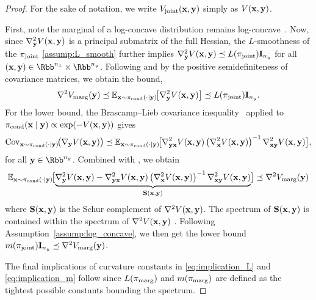 \documentclass[onefignum,onetabnum]{siamonline250211}
\newcommand{\bfI}{{\bf I}}
\newcommand{\bfS}{{\bf S}}
\newcommand{\bfx}{{\bf x}}
\newcommand{\bfy}{{\bf y}}
\newcommand{\nx}{{n_{x}}}
\newcommand{\ny}{{n_{y}}}
\newcommand{\pjoint}{\pi_{\rm joint}}
\newcommand{\pcond}{\pi_{\rm cond}}
\newcommand{\pmarg}{\pi_{\rm marg}}
\begin{document}
\begin{proof}
For the sake of notation, we write $V_{\rm joint}(\bfx,\bfy)$ simply as $V(\bfx, \bfy)$.

First, note the marginal of a log-concave distribution remains log-concave~\cite{prekopa_logarithmic_1973}.
    Now, since $\nabla_{\bfy}^2 V(\bfx, \bfy)$ is a principal submatrix of the full Hessian, the $L$-smoothness of the $\pjoint$ \ref{assump:L_smooth} further implies $\nabla_{\bfy}^2 V(\bfx, \bfy) \preceq L(\pjoint) \bfI_{\ny}$ for all  $(\bfx, \bfy)\in \Rbb^{\nx} \times \Rbb^\ny$.
    Following  and by the positive semidefiniteness of covariance matrices, we obtain the bound,
    \[
        \nabla^2 V_{\rm marg}(\bfy)
        \preceq
        \mathbb{E}_{\bfx\sim \pcond(\cdot \mid\bfy)}\!\bigl[\nabla_{\bfy}^2 V(\bfx,\bfy)\bigr]
        \preceq
        L(\pjoint) \bfI_{\ny}.
    \]
    For the lower bound, the Brascamp--Lieb covariance inequality~\cite[Theorem 4.2]{brascamp_extensions_1976} applied to $\pcond(\bfx\mid\bfy)\propto \exp(-V(\bfx,\bfy))$ gives
    \[
        \operatorname{Cov}_{\bfx \sim \pcond(\cdot\mid\bfy)}\!\bigl(\nabla_\bfy V(\bfx, \bfy)\bigr)
        \preceq
        \mathbb{E}_{\bfx\sim \pcond(\cdot \mid\bfy)}\!\bigl[\nabla_{\bfy\bfx}^2 V(\bfx, \bfy) \left(\nabla_{\bfx}^2 V(\bfx, \bfy)\right)^{-1}\nabla_{\bfx\bfy}^2V(\bfx, \bfy)\bigr],
    \]
    for all $\bfy\in \Rbb^{\ny}$.
    Combined with  , we obtain
    \begin{equation*}
        \label{eq:marginal-hessian-lower}
        \mathbb{E}_{\bfx\sim \pcond(\cdot \mid\bfy)}\!\bigl[ \underbrace{\nabla_\bfy^2 V(\bfx, \bfy) - \nabla_{\bfy\bfx}^2 V(\bfx, \bfy) \left(\nabla_{\bfx}^2 V(\bfx, \bfy)\right)^{-1}\nabla_{\bfx\bfy}^2V(\bfx, \bfy)}_{\bfS(\bfx, \bfy)} \bigr]
        \preceq  \nabla^2 V_{\rm marg}(\bfy)
    \end{equation*}
    where $\bfS(\bfx, \bfy)$ is the Schur complement of $\nabla^2 V(\bfx, \bfy)$.
    The spectrum of $\bfS(\bfx, \bfy)$ is contained within the spectrum of $\nabla^2 V(\bfx, \bfy)$ \cite[Theorem 5]{smith_interlacing_1992}.
    Following Assumption~\ref{assump:log_concave}, we then get the lower bound $m(\pjoint) \bfI_{\ny} \preceq \nabla^2 V_{\rm marg}(\bfy)$.

    The final implications of curvature constants in \eqref{eq:implication_L} and \eqref{eq:implication_m} follow since $L(\pmarg)$ and $m(\pmarg)$ are defined as the tightest possible constants bounding the spectrum.
\end{proof}
\end{document}
